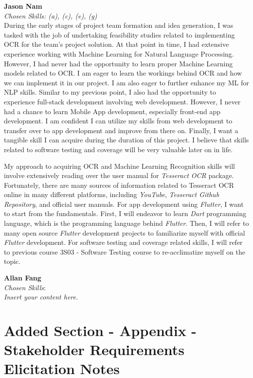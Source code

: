 \documentclass[12pt]{article}
\newcommand{\lips}{\textit{Insert your content here.}}
\begin{document}
\begin{enumerate}
  \medskip
  \textbf{Jason Nam}\\
  \textit{Chosen Skills: (a), (c), (e), (g)}\\
  During the early stages of project team formation and idea generation, I was tasked with the job of undertaking feasibility studies related to implementing OCR for the team's project solution. At that point in time, I had extensive experience working with Machine Learning for Natural Language Processing. However, I had never had the opportunity to learn proper Machine Learning models related to OCR. I am eager to learn the workings behind OCR and how we can implement it in our project. I am also eager to further enhance my ML for NLP skills.
  Similar to my previous point, I also had the opportunity to experience full-stack development involving web development. However, I never had a chance to learn Mobile App development, especially front-end app development. I am confident I can utilize my skills from web development to transfer over to app development and improve from there on.
  Finally, I want a tangible skill I can acquire during the duration of this project. I believe that skills related to software testing and coverage will be very valuable later on in life. \par
  My approach to acquiring OCR and Machine Learning Recognition skills will involve extensively reading over the user manual for \textit{Tesseract OCR} package. Fortunately, there are many sources of information related to Tesseract OCR online in many different platforms, including \textit{YouTube}, \textit{Tesseract Github Repository}, and official user manuals. For app development using \textit{Flutter}, I want to start from the fundamentals. First, I will endeavor to learn \textit{Dart} programming language, which is the programming language behind \textit{Flutter}. Then, I will refer to many open source \textit{Flutter} development projects to familiarize myself with official \textit{Flutter} development. For software testing and coverage related skills, I will refer to previous course 3S03 - Software Testing course to re-acclimatize myself on the topic.

  \medskip
  \textbf{Allan Fang}\\
  \textit{Chosen Skills}: \\
  \lips

\end{enumerate}

\section*{Added Section - Appendix - Stakeholder Requirements Elicitation Notes}
\end{document}
